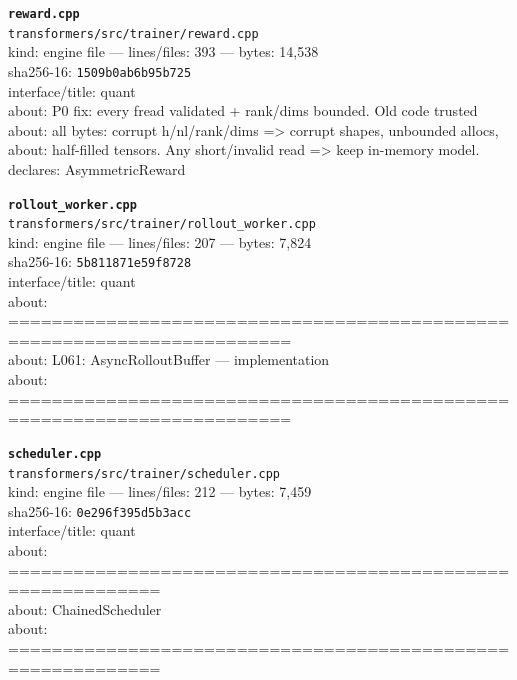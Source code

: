 \noindent\textbf{\texttt{reward.cpp}}\\
\texttt{transformers/src/trainer/reward.cpp}\\
kind: engine file --- lines/files: 393 --- bytes: 14,538\\
sha256-16: \texttt{1509b0ab6b95b725}\\
interface/title: quant\\
about: P0 fix: every fread validated + rank/dims bounded. Old code trusted\\
about: all bytes: corrupt h/nl/rank/dims => corrupt shapes, unbounded allocs,\\
about: half-filled tensors. Any short/invalid read => keep in-memory model.\\
declares: AsymmetricReward\\
\vspace*{6.0pt}

\noindent\textbf{\texttt{rollout\_worker.cpp}}\\
\texttt{transformers/src/trainer/rollout\_worker.cpp}\\
kind: engine file --- lines/files: 207 --- bytes: 7,824\\
sha256-16: \texttt{5b811871e59f8728}\\
interface/title: quant\\
about: ========================================================================\\
about: L061: AsyncRolloutBuffer — implementation\\
about: ========================================================================\\
\vspace*{6.0pt}
\newpage

\noindent\textbf{\texttt{scheduler.cpp}}\\
\texttt{transformers/src/trainer/scheduler.cpp}\\
kind: engine file --- lines/files: 212 --- bytes: 7,459\\
sha256-16: \texttt{0e296f395d5b3acc}\\
interface/title: quant\\
about: ============================================================\\
about: ChainedScheduler\\
about: ============================================================\\
\vspace*{6.0pt}

